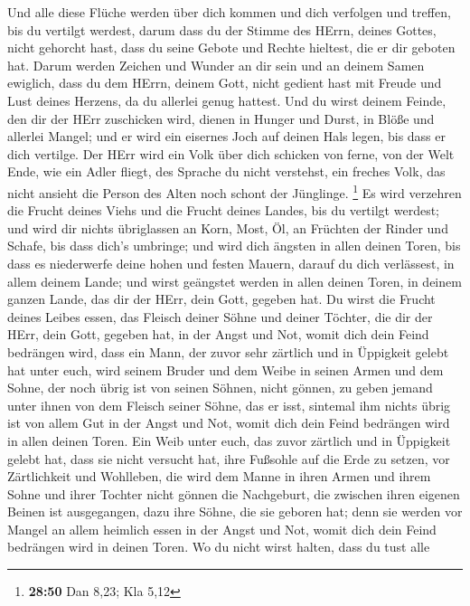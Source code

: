 Und alle diese Flüche werden über dich kommen und dich
verfolgen und treffen, bis du vertilgt werdest, darum dass du der Stimme
des HErrn, deines Gottes, nicht gehorcht hast, dass du seine Gebote und
Rechte hieltest, die er dir geboten hat.  Darum werden
Zeichen und Wunder an dir sein und an deinem Samen ewiglich,
 dass du dem HErrn, deinem Gott, nicht gedient hast mit
Freude und Lust deines Herzens, da du allerlei genug hattest.
 Und du wirst deinem Feinde, den dir der HErr zuschicken
wird, dienen in Hunger und Durst, in Blöße und allerlei Mangel; und er
wird ein eisernes Joch auf deinen Hals legen, bis dass er dich vertilge.
 Der HErr wird ein Volk über dich schicken von ferne, von
der Welt Ende, wie ein Adler fliegt, des Sprache du nicht verstehst,
 ein freches Volk, das nicht ansieht die Person des Alten
noch schont der Jünglinge. \footnote{\textbf{28:50} Dan 8,23; Kla 5,12}
 Es wird verzehren die Frucht deines Viehs und die Frucht
deines Landes, bis du vertilgt werdest; und wird dir nichts übriglassen
an Korn, Most, Öl, an Früchten der Rinder und Schafe, bis dass dich's
umbringe;  und wird dich ängsten in allen deinen Toren, bis
dass es niederwerfe deine hohen und festen Mauern, darauf du dich
verlässest, in allem deinem Lande; und wirst geängstet werden in allen
deinen Toren, in deinem ganzen Lande, das dir der HErr, dein Gott,
gegeben hat.  Du wirst die Frucht deines Leibes essen, das
Fleisch deiner Söhne und deiner Töchter, die dir der HErr, dein Gott,
gegeben hat, in der Angst und Not, womit dich dein Feind bedrängen wird,
 dass ein Mann, der zuvor sehr zärtlich und in Üppigkeit
gelebt hat unter euch, wird seinem Bruder und dem Weibe in seinen Armen
und dem Sohne, der noch übrig ist von seinen Söhnen, nicht gönnen,
 zu geben jemand unter ihnen von dem Fleisch seiner Söhne,
das er isst, sintemal ihm nichts übrig ist von allem Gut in der Angst
und Not, womit dich dein Feind bedrängen wird in allen deinen Toren.
 Ein Weib unter euch, das zuvor zärtlich und in Üppigkeit
gelebt hat, dass sie nicht versucht hat, ihre Fußsohle auf die Erde zu
setzen, vor Zärtlichkeit und Wohlleben, die wird dem Manne in ihren
Armen und ihrem Sohne und ihrer Tochter nicht gönnen  die
Nachgeburt, die zwischen ihren eigenen Beinen ist ausgegangen, dazu ihre
Söhne, die sie geboren hat; denn sie werden vor Mangel an allem heimlich
essen in der Angst und Not, womit dich dein Feind bedrängen wird in
deinen Toren.  Wo du nicht wirst halten, dass du tust alle
